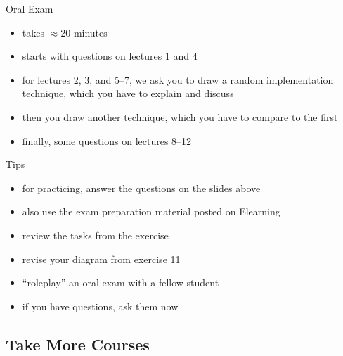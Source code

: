 \documentclass[
	aspectratio=169, %
	8pt, %
]{beamer}
\begin{document}
\begin{frame}{\myframetitle}
	\begin{mycolumns}
		\begin{definition}{Oral Exam}
			\begin{itemize}
				\item takes $\approx 20$ minutes
				\item starts with questions on lectures 1 and 4
				\item for lectures 2, 3, and 5--7, we ask you to draw a random implementation technique, which you have to explain and discuss
				\item then you draw another technique, which you have to compare to the first
				\item finally, some questions on lectures 8--12
			\end{itemize}
		\end{definition}
	\mynextcolumn
		\begin{note}{Tips}
			\begin{itemize}
				\item for practicing, answer the questions on the slides above
				\item also use the exam preparation material posted on Elearning
				\item review the tasks from the exercise
				\item revise your diagram from exercise 11
				\item ``roleplay'' an oral exam with a fellow student
				\item if you have questions, ask them now
			\end{itemize}
		\end{note}
	\end{mycolumns}
\end{frame}

\subsection{Take More Courses}
\end{document}
